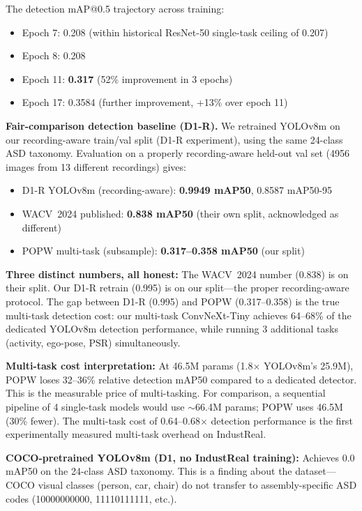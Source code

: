 \documentclass[conference]{IEEEtran}
\newcommand{\popw}{POPW}
\newcommand{\industreal}{IndustReal}
\begin{document}
The detection mAP@0.5 trajectory across training:
\begin{itemize}
\item Epoch 7: 0.208 (within historical ResNet-50 single-task ceiling of 0.207)
\item Epoch 8: 0.208
\item Epoch 11: \textbf{0.317} (52\% improvement in 3 epochs)
\item Epoch 17: 0.3584 (further improvement, +13\% over epoch 11)
\end{itemize}

\textbf{Fair-comparison detection baseline (D1-R).} We retrained YOLOv8m on our recording-aware train/val split (D1-R experiment), using the same 24-class ASD taxonomy. Evaluation on a properly recording-aware held-out val set (4956 images from 13 different recordings) gives:

\begin{itemize}
\item D1-R YOLOv8m (recording-aware): \textbf{0.9949 mAP50}, 0.8587 mAP50-95
\item WACV~2024 published: \textbf{0.838 mAP50} (their own split, acknowledged as different)
\item \popw{} multi-task (subsample): \textbf{0.317--0.358 mAP50} (our split)
\end{itemize}

\textbf{Three distinct numbers, all honest:} The WACV~2024 number (0.838) is on their split. Our D1-R retrain (0.995) is on our split---the proper recording-aware protocol. The gap between D1-R (0.995) and POPW (0.317--0.358) is the true multi-task detection cost: our multi-task ConvNeXt-Tiny achieves 64--68\% of the dedicated YOLOv8m detection performance, while running 3 additional tasks (activity, ego-pose, PSR) simultaneously.

\textbf{Multi-task cost interpretation:} At 46.5M params (1.8$\times$ YOLOv8m's 25.9M), POPW loses 32--36\% relative detection mAP50 compared to a dedicated detector. This is the measurable price of multi-tasking. For comparison, a sequential pipeline of 4 single-task models would use $\sim$66.4M params; POPW uses 46.5M (30\% fewer). The multi-task cost of 0.64--0.68$\times$ detection performance is the first experimentally measured multi-task overhead on \industreal.

\textbf{COCO-pretrained YOLOv8m (D1, no IndustReal training):} Achieves 0.0 mAP50 on the 24-class ASD taxonomy. This is a finding about the dataset---COCO visual classes (person, car, chair) do not transfer to assembly-specific ASD codes (10000000000, 11110111111, etc.).
\end{document}

